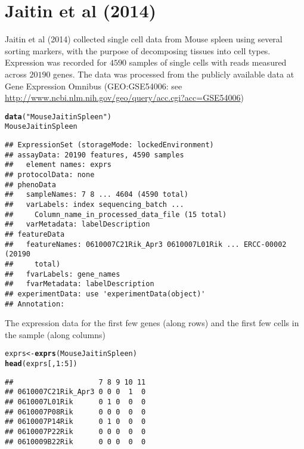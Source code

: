 \documentclass[12pt]{article}\usepackage[]{graphicx}\usepackage[usenames,dvipsnames]{color}
\makeatletter
\newcommand{\hlnum}[1]{\textcolor[rgb]{0.686,0.059,0.569}{#1}}%
\newcommand{\hlstr}[1]{\textcolor[rgb]{0.192,0.494,0.8}{#1}}%
\newcommand{\hlopt}[1]{\textcolor[rgb]{0,0,0}{#1}}%
\newcommand{\hlstd}[1]{\textcolor[rgb]{0.345,0.345,0.345}{#1}}%
\newcommand{\hlkwb}[1]{\textcolor[rgb]{0.69,0.353,0.396}{#1}}%
\newcommand{\hlkwd}[1]{\textcolor[rgb]{0.737,0.353,0.396}{\textbf{#1}}}%
\newenvironment{kframe}{%
 \def\at@end@of@kframe{}%
 \ifinner\ifhmode%
  \def\at@end@of@kframe{\end{minipage}}%
  \begin{minipage}{\columnwidth}%
 \fi\fi%
 \def\FrameCommand##1{\hskip\@totalleftmargin \hskip-\fboxsep
 \colorbox{shadecolor}{##1}\hskip-\fboxsep
     \hskip-\linewidth \hskip-\@totalleftmargin \hskip\columnwidth}%
 \MakeFramed {\advance\hsize-\width
   \@totalleftmargin\z@ \linewidth\hsize
   \@setminipage}}%
 {\par\unskip\endMakeFramed%
 \at@end@of@kframe}
\newenvironment{knitrout}{}{} %
\makeatother
\begin{document}
\section{Jaitin et al (2014)}

Jaitin et al (2014) \cite{Jaitin2014} collected single cell data from Mouse spleen using several sorting markers, with the purpose of decomposing tissues into cell types. Expression was recorded for $4590$ samples of single cells with reads measured across $20190$ genes. The data
was processed from the publicly available data at Gene Expression Omnibus (GEO:GSE54006: see \url{http://www.ncbi.nlm.nih.gov/geo/query/acc.cgi?acc=GSE54006})

\begin{knitrout}
\color{fgcolor}\begin{kframe}
\begin{alltt}
\hlkwd{data}\hlstd{(}\hlstr{"MouseJaitinSpleen"}\hlstd{)}
\hlstd{MouseJaitinSpleen}
\end{alltt}
\begin{verbatim}
## ExpressionSet (storageMode: lockedEnvironment)
## assayData: 20190 features, 4590 samples 
##   element names: exprs 
## protocolData: none
## phenoData
##   sampleNames: 7 8 ... 4604 (4590 total)
##   varLabels: index sequencing_batch ...
##     Column_name_in_processed_data_file (15 total)
##   varMetadata: labelDescription
## featureData
##   featureNames: 0610007C21Rik_Apr3 0610007L01Rik ... ERCC-00002 (20190
##     total)
##   fvarLabels: gene_names
##   fvarMetadata: labelDescription
## experimentData: use 'experimentData(object)'
## Annotation:
\end{verbatim}
\end{kframe}
\end{knitrout}

The expression data for the first few genes (along rows) and the first few
cells in the sample (along columns)

\begin{knitrout}
\color{fgcolor}\begin{kframe}
\begin{alltt}
\hlstd{exprs} \hlkwb{<-} \hlkwd{exprs}\hlstd{(MouseJaitinSpleen)}
\hlkwd{head}\hlstd{(exprs[,}\hlnum{1}\hlopt{:}\hlnum{5}\hlstd{])}
\end{alltt}
\begin{verbatim}
##                    7 8 9 10 11
## 0610007C21Rik_Apr3 0 0 0  1  0
## 0610007L01Rik      0 1 0  0  0
## 0610007P08Rik      0 0 0  0  0
## 0610007P14Rik      0 1 0  0  0
## 0610007P22Rik      0 0 0  0  0
## 0610009B22Rik      0 0 0  0  0
\end{verbatim}
\end{kframe}
\end{knitrout}
\end{document}
